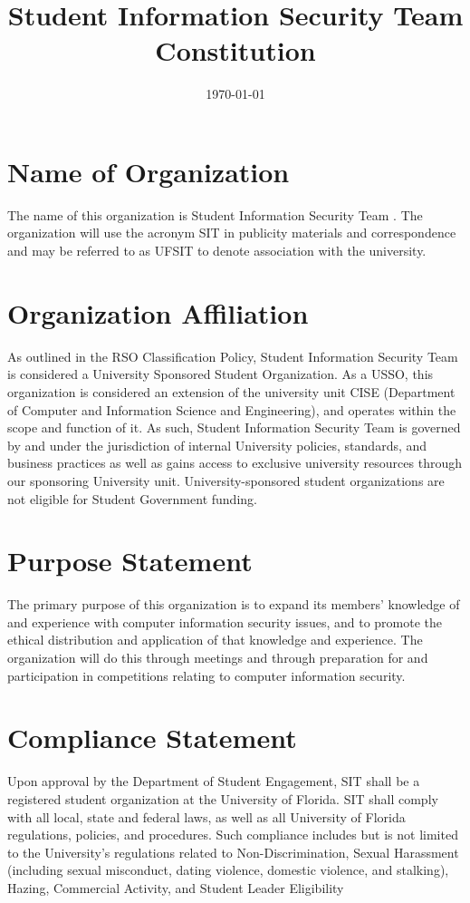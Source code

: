 \documentclass{article}
\title{Student Information Security Team \\ Constitution}
\date{\monthyeardate\today}
\def\clubname{SIT }
\def\clubfullname{Student Information Security Team }
\begin{document}
\maketitle

\section{Name of Organization}

The name of this organization is \clubfullname. The organization will use the acronym \clubname in publicity materials and correspondence and may be referred to as UFSIT to denote association with the university.


\section{Organization Affiliation}

As outlined in the RSO Classification Policy, \clubfullname  is considered a University Sponsored Student Organization. As a USSO, this organization is considered an extension of the university unit CISE (Department of Computer and Information Science and Engineering), and operates within the scope and function of it. As such, \clubfullname is governed by and under the jurisdiction of internal University policies, standards, and business practices as well as gains access to exclusive university resources through our sponsoring University unit. University-sponsored student organizations are not eligible for Student Government funding.


\section{Purpose Statement}

The primary purpose of this organization is to expand its members’ knowledge of and experience with computer information security issues, and to promote the ethical distribution and application of that knowledge and experience. 
The organization will do this through meetings and through preparation for and participation in competitions relating to computer information security. 


\section{Compliance Statement}

Upon approval by the Department of Student Engagement, \clubname shall be a registered student organization at the University of Florida. \clubname shall comply with all local, state and federal laws, as well as all University of Florida regulations, policies, and procedures. Such compliance includes but is not limited to the University’s regulations related to Non-Discrimination, Sexual Harassment (including sexual misconduct, dating violence, domestic violence, and stalking), Hazing, Commercial Activity, and Student Leader Eligibility
\end{document}
